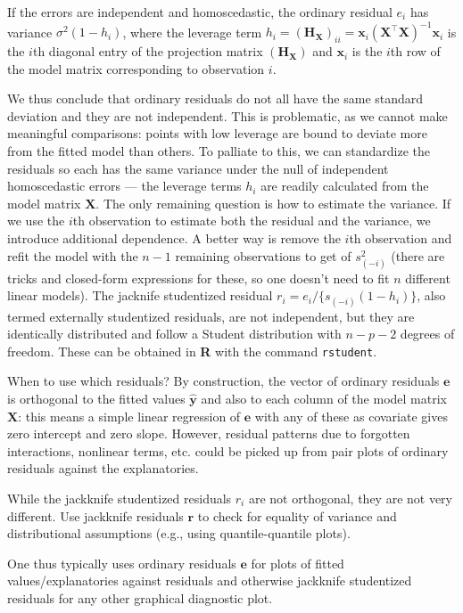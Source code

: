 \documentclass[
  11pt,
  letterpaper,
]{scrbook}
\theoremstyle{definition}
\theoremstyle{definition}
\theoremstyle{plain}
\theoremstyle{plain}
\theoremstyle{remark}
\begin{document}
If the errors are independent and homoscedastic, the ordinary residual
\(e_i\) has variance \(\sigma^2(1-h_{i})\), where the leverage term
\(h_i =(\mathbf{H}_{\mathbf{X}})_{ii} = \mathbf{x}_i (\mathbf{X}^\top\mathbf{X})^{-1}\mathbf{x}_i\)
is the \(i\)th diagonal entry of the projection matrix
\((\mathbf{H}_{\mathbf{X}})\) and \(\mathbf{x}_i\) is the \(i\)th row of
the model matrix corresponding to observation \(i\).

We thus conclude that ordinary residuals do not all have the same
standard deviation and they are not independent. This is problematic, as
we cannot make meaningful comparisons: points with low leverage are
bound to deviate more from the fitted model than others. To palliate to
this, we can standardize the residuals so each has the same variance
under the null of independent homoscedastic errors --- the leverage
terms \(h_i\) are readily calculated from the model matrix
\(\mathbf{X}\). The only remaining question is how to estimate the
variance. If we use the \(i\)th observation to estimate both the
residual and the variance, we introduce additional dependence. A better
way is remove the \(i\)th observation and refit the model with the
\(n-1\) remaining observations to get of \(s^2_{(-i)}\) (there are
tricks and closed-form expressions for these, so one doesn't need to fit
\(n\) different linear models). The jacknife studentized residual
\(r_i = e_i/\{s_{(-i)}(1-h_i)\}\), also termed externally studentized
residuals, are not independent, but they are identically distributed and
follow a Student distribution with \(n-p-2\) degrees of freedom. These
can be obtained in \textbf{R} with the command \texttt{rstudent}.

When to use which residuals? By construction, the vector of ordinary
residuals \(\boldsymbol{e}\) is orthogonal to the fitted values
\(\widehat{\boldsymbol{y}}\) and also to each column of the model matrix
\(\mathbf{X}\): this means a simple linear regression of
\(\boldsymbol{e}\) with any of these as covariate gives zero intercept
and zero slope. However, residual patterns due to forgotten
interactions, nonlinear terms, etc. could be picked up from pair plots
of ordinary residuals against the explanatories.

While the jackknife studentized residuals \(r_i\) are not orthogonal,
they are not very different. Use jackknife residuals \(\boldsymbol{r}\)
to check for equality of variance and distributional assumptions (e.g.,
using quantile-quantile plots).

One thus typically uses ordinary residuals \(\boldsymbol{e}\) for plots
of fitted values/explanatories against residuals and otherwise jackknife
studentized residuals for any other graphical diagnostic plot.
\end{document}
